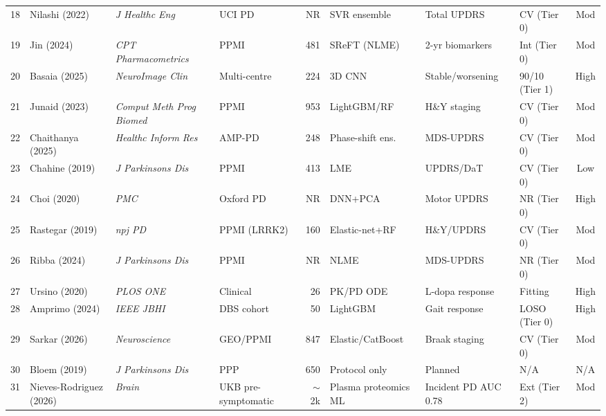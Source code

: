\begin{landscape}
\begin{longtable}{@{}clllrlllc@{}}
18 & Nilashi (2022)    & \textit{J Healthc Eng}   & UCI PD            & NR     & SVR ensemble      & Total UPDRS        & CV (Tier 0)    & Mod  \\
19 & Jin (2024)        & \textit{CPT Pharmacometrics} & PPMI         & 481    & SReFT (NLME)      & 2-yr biomarkers    & Int (Tier 0)   & Mod  \\
20 & Basaia (2025)     & \textit{NeuroImage Clin} & Multi-centre      & 224    & 3D CNN            & Stable/worsening   & 90/10 (Tier 1) & High \\
21 & Junaid (2023)     & \textit{Comput Meth Prog Biomed} & PPMI    & 953    & LightGBM/RF       & H\&Y staging       & CV (Tier 0)    & Mod  \\
22 & Chaithanya (2025) & \textit{Healthc Inform Res} & AMP-PD         & 248    & Phase-shift ens.  & MDS-UPDRS          & CV (Tier 0)    & Mod  \\
23 & Chahine (2019)    & \textit{J Parkinsons Dis}& PPMI              & 413    & LME               & UPDRS/DaT          & CV (Tier 0)    & Low  \\
24 & Choi (2020)       & \textit{PMC}             & Oxford PD         & NR     & DNN+PCA           & Motor UPDRS        & NR (Tier 0)    & High \\
25 & Rastegar (2019)   & \textit{npj PD}          & PPMI (LRRK2)      & 160    & Elastic-net+RF    & H\&Y/UPDRS         & CV (Tier 0)    & Mod  \\
26 & Ribba (2024)      & \textit{J Parkinsons Dis}& PPMI              & NR     & NLME              & MDS-UPDRS          & NR (Tier 0)    & Mod  \\
27 & Ursino (2020)     & \textit{PLOS ONE}        & Clinical          & 26     & PK/PD ODE         & L-dopa response    & Fitting        & High \\
28 & Amprimo (2024)    & \textit{IEEE JBHI}       & DBS cohort        & 50     & LightGBM          & Gait response      & LOSO (Tier 0)  & High \\
29 & Sarkar (2026)     & \textit{Neuroscience}    & GEO/PPMI          & 847    & Elastic/CatBoost  & Braak staging      & CV (Tier 0)    & Mod  \\
30 & Bloem (2019)      & \textit{J Parkinsons Dis}& PPP               & 650    & Protocol only     & Planned            & N/A            & N/A  \\
31 & Nieves-Rodriguez (2026) & \textit{Brain}     & UKB pre-symptomatic & $\sim$2k & Plasma proteomics ML & Incident PD AUC 0.78 & Ext (Tier 2) & Mod  \\

\end{longtable}
\end{landscape}
